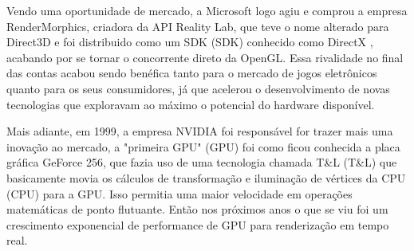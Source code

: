 Vendo uma oportunidade de mercado, a Microsoft logo agiu e comprou a empresa RenderMorphics, criadora da \acrshort{API} Reality Lab, que teve o nome alterado para Direct3D e foi distribuido como um SDK (\acrlong{SDK}) conhecido como DirectX \cite{openGLBook}, acabando por se tornar o concorrente direto da \acrshort{OpenGL}. Essa rivalidade no final das contas acabou sendo benéfica tanto para o mercado de jogos eletrônicos quanto para os seus consumidores, já que acelerou o desenvolvimento de novas tecnologias que exploravam ao máximo o potencial do hardware disponível.
	
Mais adiante, em 1999, a empresa NVIDIA foi responsável for trazer mais uma inovação ao mercado, a "primeira GPU" (\acrlong{GPU}) foi como ficou conhecida a placa gráfica GeForce 256, que fazia uso de uma tecnologia chamada T\&L (\acrlong{T&L}) que basicamente movia os cálculos de transformação e iluminação de vértices da CPU (\acrlong{CPU}) para a \acrshort{GPU}. Isso permitia uma maior velocidade em operações matemáticas de ponto flutuante. Então nos próximos anos o que se viu foi um crescimento exponencial de performance de \acrshort{GPU} para renderização em tempo real.


